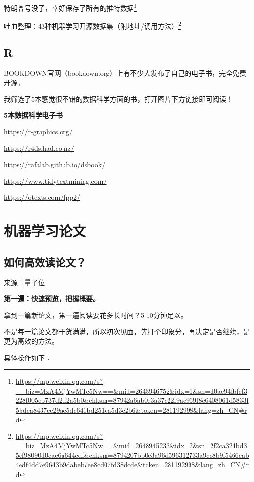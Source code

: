 \documentclass[]{ctexbook}
\renewcommand{\href}[2]{#2\footnote{\url{#1}}}
\begin{document}
\href{https://mp.weixin.qq.com/s?__biz=MzA4MjYwMTc5Nw==\&mid=2648946752\&idx=1\&sn=d0ac94fbfcf3228f005eb737d2d2a5b0\&chksm=87942a6ab0e3a37c22f9ac969f8c6408061d5833f5bdea8437ce29ae5dc641bd251ea5d3c2b6\&token=281192998\&lang=zh_CN\#rd}{特朗普号没了，幸好保存了所有的推特数据}

\href{https://mp.weixin.qq.com/s?__biz=MzA4MjYwMTc5Nw==\&mid=2648945233\&idx=2\&sn=2f2ca324bd35cf98090d0cac6a644cdf\&chksm=8794207bb0e3a96d596312733a9cc8b9f5466cab4edf4dd7e9643b9dabeb7ee8cd07fd38dcde\&token=281192998\&lang=zh_CN\#rd}{吐血整理：43种机器学习开源数据集（附地址/调用方法）}

\hypertarget{r}{%
\section{R}\label{r}}

BOOKDOWN官网（bookdown.org）上有不少人发布了自己的电子书，完全免费开源，

我筛选了5本感觉很不错的数据科学方面的书，打开图片下方链接即可阅读！

\textbf{5本数据科学电子书}

\url{https://r-graphics.org/}

\url{https://r4ds.had.co.nz/}

\url{https://rafalab.github.io/dsbook/}

\url{https://www.tidytextmining.com/}

\url{https://otexts.com/fpp2/}

\hypertarget{ux673aux5668ux5b66ux4e60ux8bbaux6587}{%
\chapter{机器学习论文}\label{ux673aux5668ux5b66ux4e60ux8bbaux6587}}

\hypertarget{ux5982ux4f55ux9ad8ux6548ux8bfbux8bbaux6587}{%
\section{如何高效读论文？}\label{ux5982ux4f55ux9ad8ux6548ux8bfbux8bbaux6587}}

来源：量子位

\textbf{第一遍：快速预览，把握概要。}

拿到一篇新论文，第一遍阅读要花多长时间？5-10分钟足以。

不是每一篇论文都干货满满，所以初次见面，先打个印象分，再决定是否继续，是更为高效的方法。

具体操作如下：
\end{document}
